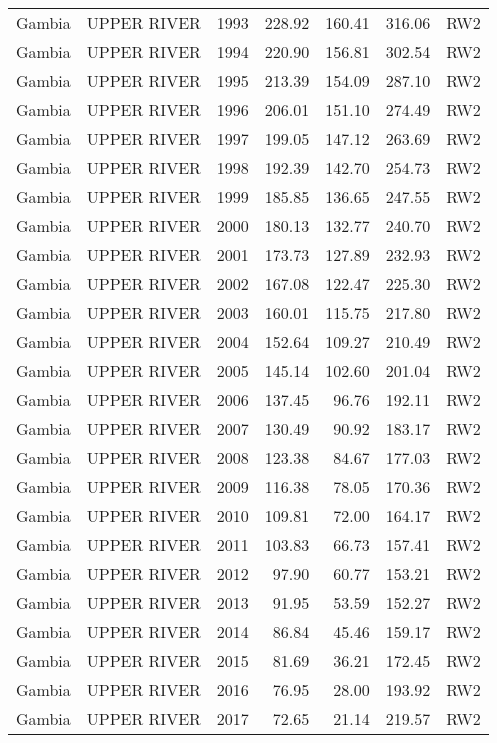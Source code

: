 \begin{longtable}{lllrrrl}
  Gambia & UPPER RIVER & 1993 & 228.92 & 160.41 & 316.06 & RW2 \\ 
  Gambia & UPPER RIVER & 1994 & 220.90 & 156.81 & 302.54 & RW2 \\ 
  Gambia & UPPER RIVER & 1995 & 213.39 & 154.09 & 287.10 & RW2 \\ 
  Gambia & UPPER RIVER & 1996 & 206.01 & 151.10 & 274.49 & RW2 \\ 
  Gambia & UPPER RIVER & 1997 & 199.05 & 147.12 & 263.69 & RW2 \\ 
  Gambia & UPPER RIVER & 1998 & 192.39 & 142.70 & 254.73 & RW2 \\ 
  Gambia & UPPER RIVER & 1999 & 185.85 & 136.65 & 247.55 & RW2 \\ 
  Gambia & UPPER RIVER & 2000 & 180.13 & 132.77 & 240.70 & RW2 \\ 
  Gambia & UPPER RIVER & 2001 & 173.73 & 127.89 & 232.93 & RW2 \\ 
  Gambia & UPPER RIVER & 2002 & 167.08 & 122.47 & 225.30 & RW2 \\ 
  Gambia & UPPER RIVER & 2003 & 160.01 & 115.75 & 217.80 & RW2 \\ 
  Gambia & UPPER RIVER & 2004 & 152.64 & 109.27 & 210.49 & RW2 \\ 
  Gambia & UPPER RIVER & 2005 & 145.14 & 102.60 & 201.04 & RW2 \\ 
  Gambia & UPPER RIVER & 2006 & 137.45 & 96.76 & 192.11 & RW2 \\ 
  Gambia & UPPER RIVER & 2007 & 130.49 & 90.92 & 183.17 & RW2 \\ 
  Gambia & UPPER RIVER & 2008 & 123.38 & 84.67 & 177.03 & RW2 \\ 
  Gambia & UPPER RIVER & 2009 & 116.38 & 78.05 & 170.36 & RW2 \\ 
  Gambia & UPPER RIVER & 2010 & 109.81 & 72.00 & 164.17 & RW2 \\ 
  Gambia & UPPER RIVER & 2011 & 103.83 & 66.73 & 157.41 & RW2 \\ 
  Gambia & UPPER RIVER & 2012 & 97.90 & 60.77 & 153.21 & RW2 \\ 
  Gambia & UPPER RIVER & 2013 & 91.95 & 53.59 & 152.27 & RW2 \\ 
  Gambia & UPPER RIVER & 2014 & 86.84 & 45.46 & 159.17 & RW2 \\ 
  Gambia & UPPER RIVER & 2015 & 81.69 & 36.21 & 172.45 & RW2 \\ 
  Gambia & UPPER RIVER & 2016 & 76.95 & 28.00 & 193.92 & RW2 \\ 
  Gambia & UPPER RIVER & 2017 & 72.65 & 21.14 & 219.57 & RW2 \\ 

\end{longtable}
